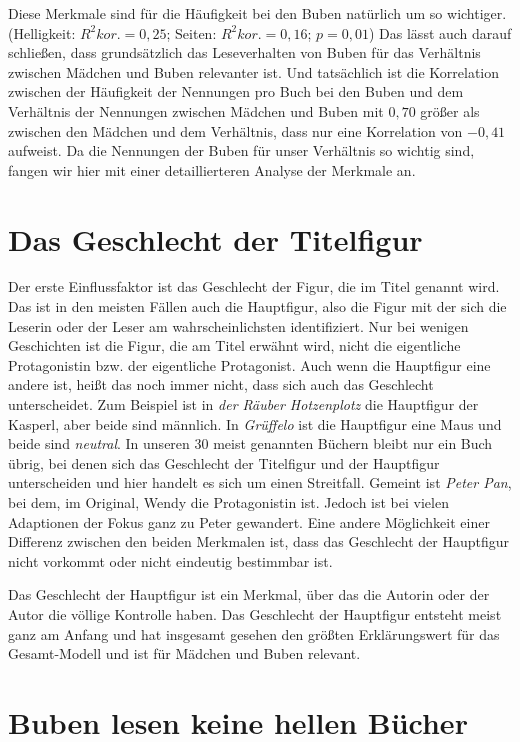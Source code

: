 Diese Merkmale sind für die Häufigkeit bei den Buben natürlich um so
wichtiger. (Helligkeit: $R^2 \scriptstyle kor.\textstyle =0{,}25$;
Seiten: $R^2 \scriptstyle kor.\textstyle =0{,}16$; $p=0{,}01$) Das lässt
auch darauf schließen, dass grundsätzlich das Leseverhalten von Buben
für das Verhältnis zwischen Mädchen und Buben relevanter ist. Und
tatsächlich ist die Korrelation zwischen der Häufigkeit der Nennungen
pro Buch bei den Buben und dem Verhältnis der Nennungen zwischen Mädchen
und Buben mit $0{,}70$ größer als zwischen den Mädchen und dem
Verhältnis, dass nur eine Korrelation von $-0{,}41$ aufweist. Da die
Nennungen der Buben für unser Verhältnis so wichtig sind, fangen wir
hier mit einer detaillierteren Analyse der Merkmale an.

\section{Das Geschlecht der Titelfigur}

Der erste Einflussfaktor ist das Geschlecht der Figur, die im Titel
genannt wird. Das ist in den meisten Fällen auch die Hauptfigur, also
die Figur mit der sich die Leserin oder der Leser am wahrscheinlichsten
identifiziert. Nur bei wenigen Geschichten ist die Figur, die am Titel
erwähnt wird, nicht die eigentliche Protagonistin bzw. der eigentliche
Protagonist. Auch wenn die Hauptfigur eine andere ist, heißt das noch
immer nicht, dass sich auch das Geschlecht unterscheidet. Zum Beispiel
ist in \emph{der Räuber Hotzenplotz} die Hauptfigur der Kasperl, aber
beide sind männlich. In \emph{Grüffelo} ist die Hauptfigur eine Maus und
beide sind \emph{neutral}. In unseren 30 meist genannten Büchern bleibt
nur ein Buch übrig, bei denen sich das Geschlecht der Titelfigur und der
Hauptfigur unterscheiden und hier handelt es sich um einen Streitfall.
Gemeint ist \emph{Peter Pan}, bei dem, im Original, Wendy die
Protagonistin ist. Jedoch ist bei vielen Adaptionen der Fokus ganz zu
Peter gewandert. Eine andere Möglichkeit einer Differenz zwischen den
beiden Merkmalen ist, dass das Geschlecht der Hauptfigur nicht vorkommt
oder nicht eindeutig bestimmbar ist.

Das Geschlecht der Hauptfigur ist ein Merkmal, über das die Autorin oder
der Autor die völlige Kontrolle haben. Das Geschlecht der Hauptfigur
entsteht meist ganz am Anfang und hat insgesamt gesehen den größten
Erklärungswert für das Gesamt-Modell und ist für Mädchen und Buben
relevant.

\section{Buben lesen keine hellen Bücher}

